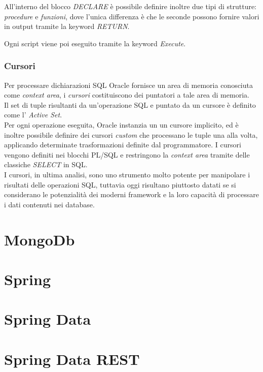 All'interno del blocco \textit{DECLARE} è possibile definire inoltre due tipi di strutture: \textit{procedure} e \textit{funzioni}, dove l'unica differenza è che le seconde possono fornire valori in output tramite la keyword \textit{RETURN}.

Ogni script viene poi eseguito tramite la keyword \textit{Execute}.

\subsubsection{Cursori}
Per processare dichiarazioni SQL Oracle fornisce un area di memoria conosciuta come \textit{context area}, i \textit{cursori} costituiscono dei puntatori a tale area di memoria.\\
Il set di tuple risultanti da un'operazione SQL e puntato da un cursore è definito come l' \textit{Active Set}.\\
Per ogni operazione eseguita, Oracle instanzia un un cursore implicito, ed è inoltre possibile definire dei cursori \textit{custom} che processano le tuple una alla volta, applicando determinate trasformazioni definite dal programmatore.
I cursori vengono definiti nei blocchi PL/SQL e restringono la \textit{context area} tramite delle classiche \textit{SELECT} in SQL.\\
I cursori, in ultima analisi, sono uno strumento molto potente per manipolare i risultati delle operazioni SQL, tuttavia oggi risultano piuttosto datati se si considerano le potenzialità dei moderni \gls{framework} e la loro capacità di processare i dati contenuti nei database.

\section{MongoDb}

\section{Spring}

\section{Spring Data}

\section{Spring Data REST}
